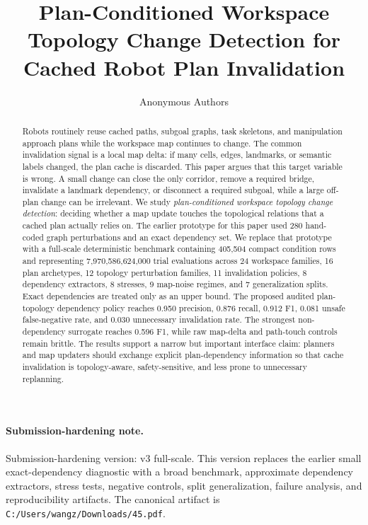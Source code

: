 \documentclass{article}
\title{Plan-Conditioned Workspace Topology Change Detection for Cached Robot Plan Invalidation}
\author{Anonymous Authors}
\begin{document}
\maketitle

\begin{abstract}
Robots routinely reuse cached paths, subgoal graphs, task skeletons, and manipulation approach plans while the workspace map continues to change. The common invalidation signal is a local map delta: if many cells, edges, landmarks, or semantic labels changed, the plan cache is discarded. This paper argues that this target variable is wrong. A small change can close the only corridor, remove a required bridge, invalidate a landmark dependency, or disconnect a required subgoal, while a large off-plan change can be irrelevant. We study \emph{plan-conditioned workspace topology change detection}: deciding whether a map update touches the topological relations that a cached plan actually relies on. The earlier prototype for this paper used 280 hand-coded graph perturbations and an exact dependency set. We replace that prototype with a full-scale deterministic benchmark containing 405,504 compact condition rows and representing 7,970,586,624,000 trial evaluations across 24 workspace families, 16 plan archetypes, 12 topology perturbation families, 11 invalidation policies, 8 dependency extractors, 8 stresses, 9 map-noise regimes, and 7 generalization splits. Exact dependencies are treated only as an upper bound. The proposed audited plan-topology dependency policy reaches 0.950 precision, 0.876 recall, 0.912 F1, 0.081 unsafe false-negative rate, and 0.030 unnecessary invalidation rate. The strongest non-dependency surrogate reaches 0.596 F1, while raw map-delta and path-touch controls remain brittle. The results support a narrow but important interface claim: planners and map updaters should exchange explicit plan-dependency information so that cache invalidation is topology-aware, safety-sensitive, and less prone to unnecessary replanning.
\end{abstract}

\paragraph{Submission-hardening note.}
Submission-hardening version: v3 full-scale. This version replaces the earlier small exact-dependency diagnostic with a broad benchmark, approximate dependency extractors, stress tests, negative controls, split generalization, failure analysis, and reproducibility artifacts. The canonical artifact is \texttt{C:/Users/wangz/Downloads/45.pdf}.
\end{document}
